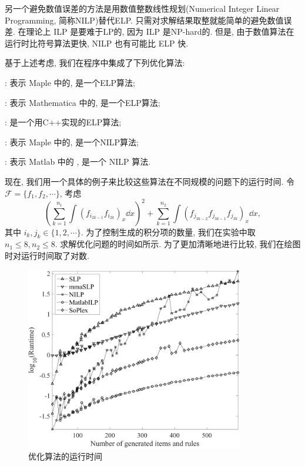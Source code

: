 另一个避免数值误差的方法是用数值整数线性规划(Numerical Integer Linear Programming, 简称NILP)替代ELP. 只需对求解结果取整就能简单的避免数值误差. 在理论上 ILP 是要难于LP的, 因为 ILP 是NP-hard的. 但是, 由于数值算法在运行时比符号算法更快, NILP 也有可能比 ELP 快. 

基于上述考虑, 我们在程序中集成了下列优化算法: 
\begin{compactitem}[\textbullet]
\item {}: 表示 Maple 中的, 是一个ELP算法; 
\item {}: 表示 Mathematica 中的, 是一个ELP算法;
\item {}\citep{soplex}: 是一个用C++实现的ELP算法;
\item {}: 表示 Maple 中的, 是一个NILP算法;
\item {}: 表示 Matlab 中的  , 是一个 NILP 算法.
\end{compactitem}

现在, 我们用一个具体的例子来比较这些算法在不同规模的问题下的运行时间. 令$\mathcal F=\{f_1,f_2,\cdots\}$, 考虑
\begin{equation}
\left(\sum\limits_{k=1}^{n_1}{\int\!{(f_{i_{2k-1}}f_{i_{2k}})_x\dd x}}\right)^2+\sum\limits_{k=1}^{n_2}{\int\!{(f_{j_{3k-2}}f_{j_{3k-1}}f_{j_{3k}})_x\dd x}},
\end{equation}
其中 $i_k,j_k \in \{1,2,\cdots\}$. 为了控制生成的积分项的数量, 我们在实验中取$n_1\le 8,n_2\le 8$. 求解优化问题的时间如所示. 为了更加清晰地进行比较, 我们在绘图时对运行时间取了对数. 

\begin{figure}[htb]
\centering
\includegraphics[width=0.85\textwidth]{fig/int-6.pdf}
\caption{优化算法的运行时间}\label{opts_log}
\label{opts_all}
\end{figure}

